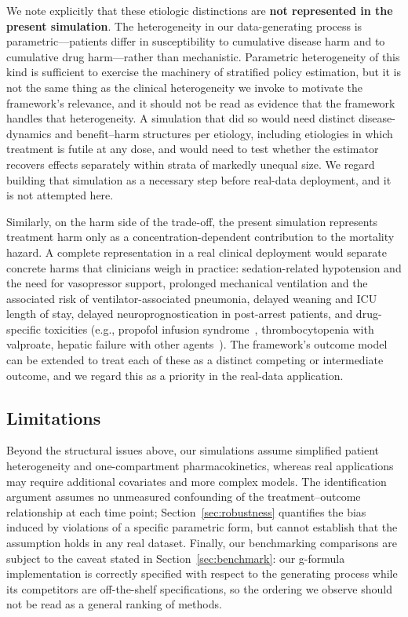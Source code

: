We note explicitly that these etiologic distinctions are \textbf{not represented in the present
simulation}. The heterogeneity in our data-generating process is parametric---patients differ in
susceptibility to cumulative disease harm and to cumulative drug harm---rather than mechanistic.
Parametric heterogeneity of this kind is sufficient to exercise the machinery of stratified policy
estimation, but it is not the same thing as the clinical heterogeneity we invoke to motivate the
framework's relevance, and it should not be read as evidence that the framework handles that
heterogeneity. A simulation that did so would need distinct disease-dynamics and benefit--harm
structures per etiology, including etiologies in which treatment is futile at any dose, and would
need to test whether the estimator recovers effects separately within strata of markedly unequal
size. We regard building that simulation as a necessary step before real-data deployment, and it is
not attempted here.

Similarly, on the harm side of the trade-off, the present simulation represents treatment harm only
as a concentration-dependent contribution to the mortality hazard. A complete representation in a
real clinical deployment would separate concrete harms that clinicians weigh in practice:
sedation-related hypotension and the need for vasopressor support, prolonged mechanical ventilation
and the associated risk of ventilator-associated pneumonia, delayed weaning and ICU length of stay,
delayed neuroprognostication in post-arrest patients, and drug-specific toxicities (e.g., propofol
infusion syndrome~\cite{kam2007propofol}, thrombocytopenia with valproate, hepatic failure with other
agents~\cite{perucca2012adverse}). The framework's outcome model can be extended to treat each of
these as a distinct competing or intermediate outcome, and we regard this as a priority in the
real-data application.

\subsection{Limitations}

Beyond the structural issues above, our simulations assume simplified patient heterogeneity and
one-compartment pharmacokinetics, whereas real applications may require additional covariates and
more complex models. The identification argument assumes no unmeasured confounding of the
treatment--outcome relationship at each time point; Section~\ref{sec:robustness} quantifies the
bias induced by violations of a specific parametric form, but cannot establish that the assumption
holds in any real dataset. Finally, our benchmarking comparisons are subject to the caveat stated in
Section~\ref{sec:benchmark}: our g-formula implementation is correctly specified with respect to the
generating process while its competitors are off-the-shelf specifications, so the ordering we
observe should not be read as a general ranking of methods.

